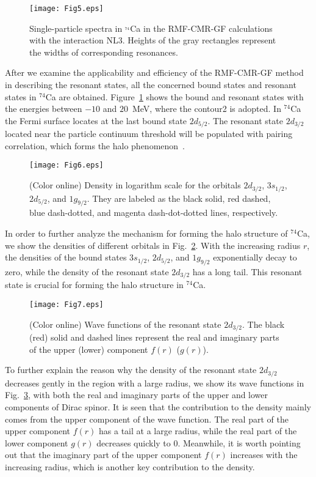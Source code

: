 \documentclass[twocolumn,prc,preprintnumbers,superscriptaddress,floatfix,showpacs]{revtex4}
\begin{document}
\begin{figure}%
\texttt{[image: Fig5.eps]}
\caption{Single-particle spectra in $^{_{74}}$Ca in the RMF-CMR-GF calculations with the interaction NL3. Heights of the gray rectangles represent the widths of corresponding resonances.}
\label{Fig5}
\end{figure}

After we examine the applicability and efficiency of the RMF-CMR-GF method in describing the resonant states, all the concerned bound states and resonant states in $^{74}$Ca are obtained. Figure~\ref{Fig5} shows the bound and resonant states with the energies between $-10$ and $20$~MeV, where the contour2 is adopted. In $^{74}$Ca the Fermi surface locates at the last bound state $2d_{5/2}$. The resonant state $2d_{3/2}$ located near the particle continuum threshold will be populated with pairing correlation, which forms the halo phenomenon~\cite{Meng2002}.

\begin{figure}%
\texttt{[image: Fig6.eps]}
\caption{(Color online) Density in logarithm scale for the orbitals $2d_{3/2}$, $3s_{1/2}$, $2d_{5/2}$, and $1g_{9/2}$. They are labeled as the black solid, red dashed, blue dash-dotted, and magenta dash-dot-dotted lines, respectively.}
\label{Fig6}
\end{figure}

In order to further analyze the mechanism for forming the halo structure of $^{74}$Ca, we show the densities of different orbitals in Fig.~\ref{Fig6}. With the increasing radius $r$, the densities of the bound states $3s_{1/2}$, $2d_{5/2}$, and $1g_{9/2}$ exponentially decay to zero, while the density of the resonant state $2d_{3/2}$ has a long tail. This resonant state is crucial for forming the halo structure in $^{74}$Ca.

\begin{figure}%
\texttt{[image: Fig7.eps]}
\caption{(Color online) Wave functions of the resonant state $2d_{3/2}$. The black (red) solid and dashed lines represent the real and imaginary parts of the upper (lower) component $f(r)$ ($g(r)$).}
\label{Fig7}
\end{figure}


To further explain the reason why the density of the resonant state $2d_{3/2}$ decreases gently in the region with a large radius, we show its wave functions in Fig.~\ref{Fig7}, with both the real and imaginary parts of the upper and lower components of Dirac spinor. It is seen that the contribution to the density mainly comes from the upper component of the wave function. The real part of the upper component $f(r)$ has a tail at a large radius, while the real part of the lower component $g(r)$ decreases quickly to $0$. Meanwhile, it is worth pointing out that the imaginary part of the upper component $f(r)$ increases with the increasing radius, which is another key contribution to the density.
\end{document}
